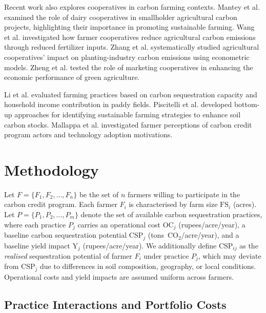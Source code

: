 \documentclass[manuscript, screen, review, anonymous]{acmart}
\begin{document}
Recent work also explores cooperatives in carbon farming contexts. Mantey et al. \cite{mantey2025carbon} examined the role of dairy cooperatives in smallholder agricultural carbon projects, highlighting their importance in promoting sustainable farming. Wang et al. \cite{wang2024effects} investigated how farmer cooperatives reduce agricultural carbon emissions through reduced fertilizer inputs. Zhang et al. \cite{zhang2025can} systematically studied agricultural cooperatives’ impact on planting-industry carbon emissions using econometric models. Zheng et al. \cite{zheng2023economic} tested the role of marketing cooperatives in enhancing the economic performance of green agriculture.

Li et al. \cite{li2013carbon} evaluated farming practices based on carbon sequestration capacity and household income contribution in paddy fields. Piscitelli et al. \cite{piscitelli2023carbon} developed bottom-up approaches for identifying sustainable farming strategies to enhance soil carbon stocks. Mallappa et al. \cite{MALLAPPA2025100317} investigated farmer perceptions of carbon credit program actors and technology adoption motivations.


\newpage
\section{Methodology}

Let $F = \{F_1, F_2, \ldots, F_n\}$ be the set of $n$ farmers willing to
participate in the carbon credit program. Each farmer $F_i$ is characterised
by farm size $\text{FS}_i$ (acres). Let $P = \{P_1, P_2, \ldots, P_m\}$
denote the set of available carbon sequestration practices, where each practice
$P_j$ carries an operational cost $\text{OC}_j$ (rupees/acre/year), a baseline
carbon sequestration potential $\text{CSP}_j$ (tons~CO$_2$/acre/year), and a
baseline yield impact $\text{Y}_j$ (rupees/acre/year). We additionally define
$\text{CSP}_{ij}$ as the \emph{realised} sequestration potential of farmer
$F_i$ under practice $P_j$, which may deviate from $\text{CSP}_j$ due to
differences in soil composition, geography, or local conditions. Operational
costs and yield impacts are assumed uniform across farmers.

\subsection{Practice Interactions and Portfolio Costs}
\end{document}
